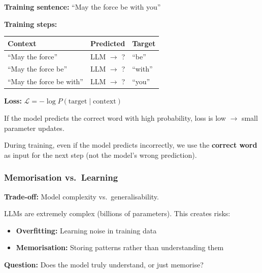 \begin{exbox}
\textbf{Training sentence:} ``May the force be with you''

\textbf{Training steps:}
\begin{center}
\begin{tabular}{@{} l l l @{}}
\toprule
\textbf{Context} & \textbf{Predicted} & \textbf{Target} \\
\midrule
``May the force'' & LLM $\to$ ? & ``be'' \\
``May the force be'' & LLM $\to$ ? & ``with'' \\
``May the force be with'' & LLM $\to$ ? & ``you'' \\
\bottomrule
\end{tabular}
\end{center}

\textbf{Loss:} $\mathcal{L} = -\log P(\text{target} \mid \text{context})$

If the model predicts the correct word with high probability, loss is low $\to$ small parameter updates.
\end{exbox}

\begin{tipbox}
During training, even if the model predicts incorrectly, we use the \textbf{correct word} as input for the next step (not the model's wrong prediction).
\end{tipbox}

\bigseparator

\subsubsection{Memorisation vs.\ Learning}

\begin{tipbox}
\textbf{Trade-off:} Model complexity vs.\ generalisability.

LLMs are extremely complex (billions of parameters). This creates risks:
\begin{itemize}
  \item \textbf{Overfitting:} Learning noise in training data
  \item \textbf{Memorisation:} Storing patterns rather than understanding them
\end{itemize}

\textbf{Question:} Does the model truly understand, or just memorise?
\end{tipbox}

